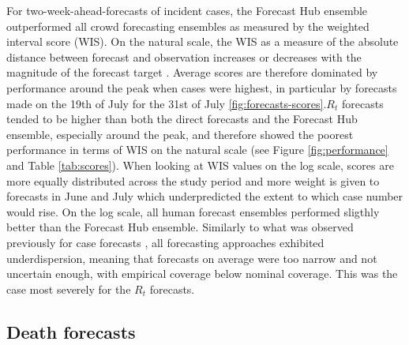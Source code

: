 \documentclass[10pt,a4paper,twocolumn]{article}
\begin{document}
For two-week-ahead-forecasts of incident cases, the Forecast Hub ensemble outperformed all crowd forecasting ensembles as measured by the weighted interval score (WIS). On the natural scale, the WIS as a measure of the absolute distance between forecast and observation increases or decreases with the magnitude of the forecast target \cite{bosseTransformationForecastsEvaluating2023, bracherEvaluatingEpidemicForecasts2021}. Average scores are therefore dominated by performance around the peak when cases were highest, in particular by forecasts made on the 19th of July for the 31st of July \ref{fig:forecasts-scores}.$R_t$ forecasts tended to be higher than both the direct forecasts and the Forecast Hub ensemble, especially around the peak, and therefore showed the poorest performance in terms of WIS on the natural scale (see Figure \ref{fig:performance} and Table \ref{tab:scores}). When looking at WIS values on the log scale,
scores are more equally distributed across the study period and more weight is given to forecasts in June and July which underpredicted the extent to which case number would rise. On the log scale, all human forecast ensembles performed sligthly better than the Forecast Hub ensemble. Similarly to what was observed previously for case forecasts \citep{bosseComparingHumanModelbased2022, sherrattPredictivePerformanceMultimodel2022a}, all forecasting approaches exhibited underdispersion, meaning that forecasts on average were too narrow and not uncertain enough, with empirical coverage below nominal coverage. This was the case most severely for the $R_t$ forecasts. 




\subsection*{Death forecasts} 
\end{document}
